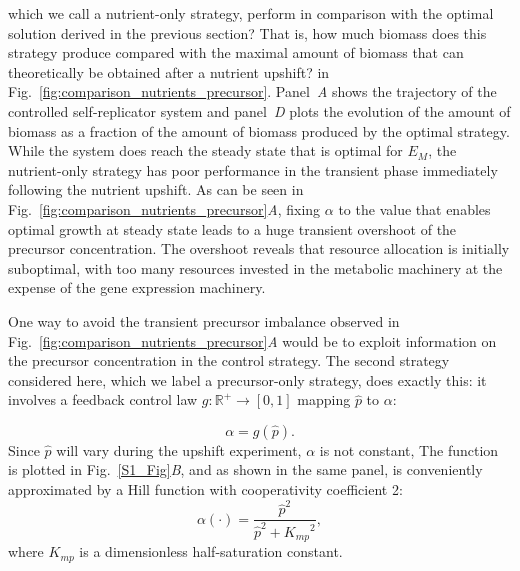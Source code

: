  which we call a nutrient-only strategy, perform in comparison with the optimal solution derived in the previous section?
That is, how much biomass does this strategy produce compared with the maximal amount of biomass that can theoretically be obtained after a nutrient upshift?
 in Fig.~\ref{fig:comparison_nutrients_precursor}.
Panel~\textit{A} shows the trajectory of the controlled self-replicator system and panel~\textit{D} plots the evolution of the amount of biomass as a fraction of the amount of biomass produced by the optimal strategy.
While the system does reach the steady state that is optimal for $E_M$, the nutrient-only strategy has poor performance in the transient phase immediately following the nutrient upshift.
As can be seen  in Fig.~\ref{fig:comparison_nutrients_precursor}\textit{A}, fixing $\alpha$ to the value that enables optimal growth at steady state leads to a huge transient overshoot of the precursor concentration.
The overshoot reveals that resource allocation is initially suboptimal, with too many resources invested in the metabolic machinery at the expense of the gene expression machinery.

One way to avoid the transient precursor imbalance observed in Fig.~\ref{fig:comparison_nutrients_precursor}\textit{A} would be to exploit information on the precursor concentration in the control strategy.
The second strategy considered here, which we label a precursor-only strategy, does exactly this: it involves a feedback control law $g \colon \mathbb{R}^+ \to [0,1]$ mapping $\hat{p}$ to $\alpha$:

\begin{equation}
\alpha = g(\hat{p}).
\label{eq:precursorstrategy}
\end{equation}
Since $\hat{p}$ will vary during the upshift experiment, $\alpha$ is not constant, 
The function is plotted in Fig.~\ref{S1_Fig}\textit{B}, and as shown in the same panel, is conveniently approximated by a Hill function with cooperativity coefficient 2:
\begin{equation}\label{eq:HillApprox}
\alpha (\cdot)= \dfrac{\hat{p}^2}{\hat{p}^2 + {K_{mp}}^2},
\end{equation}
where $K_{mp}$ is a dimensionless half-saturation constant.

